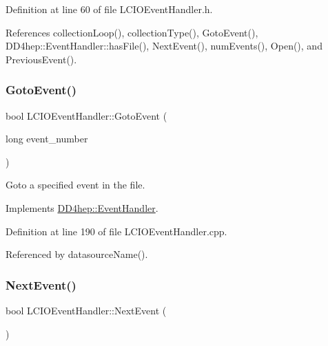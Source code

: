 Definition at line 60 of file L\+C\+I\+O\+Event\+Handler.\+h.



References collection\+Loop(), collection\+Type(), Goto\+Event(), D\+D4hep\+::\+Event\+Handler\+::has\+File(), Next\+Event(), num\+Events(), Open(), and Previous\+Event().

\hypertarget{class_d_d4hep_1_1_l_c_i_o_event_handler_af7089e4660ace0f0a4da544bb39660e5}{}\label{class_d_d4hep_1_1_l_c_i_o_event_handler_af7089e4660ace0f0a4da544bb39660e5} 
\subsubsection{\texorpdfstring{Goto\+Event()}{GotoEvent()}}
{\footnotesize\ttfamily bool L\+C\+I\+O\+Event\+Handler\+::\+Goto\+Event (\begin{DoxyParamCaption}\item[{long}]{event\+\_\+number }\end{DoxyParamCaption})\hspace{0.3cm}{\ttfamily [virtual]}}



Goto a specified event in the file. 



Implements \hyperlink{class_d_d4hep_1_1_event_handler_a09c40b0b753455c1e3df7c561ff6b069}{D\+D4hep\+::\+Event\+Handler}.



Definition at line 190 of file L\+C\+I\+O\+Event\+Handler.\+cpp.



Referenced by datasource\+Name().

\hypertarget{class_d_d4hep_1_1_l_c_i_o_event_handler_a14966ef5f33d58b1f0f3b952a334d48f}{}\label{class_d_d4hep_1_1_l_c_i_o_event_handler_a14966ef5f33d58b1f0f3b952a334d48f} 
\subsubsection{\texorpdfstring{Next\+Event()}{NextEvent()}}
{\footnotesize\ttfamily bool L\+C\+I\+O\+Event\+Handler\+::\+Next\+Event (\begin{DoxyParamCaption}{ }\end{DoxyParamCaption})\hspace{0.3cm}{\ttfamily [virtual]}}



